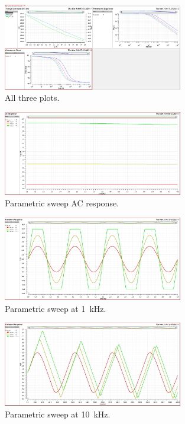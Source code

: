 \documentclass[11pt]{article}
\begin{document}
\begin{figure}[H]
\centering
\includegraphics[width=0.7\textwidth]{./param_rc.png}
\caption{\label{fig:param_rc}All three plots.}
\end{figure}

\begin{figure}[H]
\centering
\includegraphics[width=0.7\textwidth]{./param_ac_resp.png}
\caption{\label{fig:param_ac_resp}Parametric sweep AC response.}
\end{figure}

\begin{figure}[H]
\centering
\includegraphics[width=0.7\textwidth]{./param_1k.png}
\caption{\label{fig:param_1k}Parametric sweep at \qty{1}{\kilo\hertz}.}
\end{figure}

\begin{figure}[H]
\centering
\includegraphics[width=0.7\textwidth]{./param_10k.png}
\caption{\label{fig:param_10k}Parametric sweep at \qty{10}{\kilo\hertz}.}
\end{figure}
\end{document}
